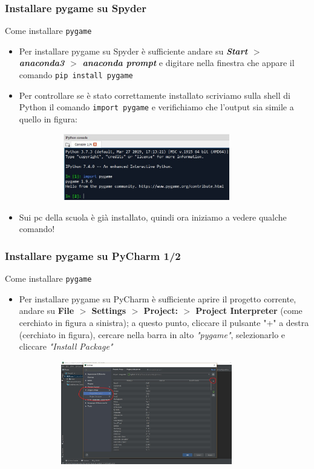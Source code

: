 \documentclass{beamer}
\begin{document}
\begin{frame}[fragile]
\frametitle{Installare pygame su Spyder}
	\begin{block}{Come installare \texttt{pygame}}
		\begin{itemize}
			\item Per installare pygame su Spyder è sufficiente andare su \textit{\textbf{Start $>$ anaconda3 $>$ anaconda prompt}} e digitare nella finestra che appare il comando \texttt{pip install pygame}
			\item Per controllare se è stato correttamente installato scriviamo sulla shell di Python il comando \texttt{import pygame} e verifichiamo che l'output sia simile a quello in figura:
			\begin{figure}[t]
				\includegraphics[height=2.9cm, width=9cm]{images/Import-pygame.jpg}
			\end{figure}
			\item Sui pc della scuola è già installato, quindi ora iniziamo a vedere qualche comando!
		\end{itemize}
	\end{block}
\end{frame}

\begin{frame}[fragile]
\frametitle{Installare pygame su PyCharm 1/2}
\begin{block}{Come installare \texttt{pygame}}
	\begin{itemize}
		\item Per installare pygame su PyCharm è sufficiente aprire il progetto corrente, andare su \textbf{File $>$ Settings $>$ Project: $>$ Project Interpreter} (come cerchiato in figura a sinistra); a questo punto, cliccare il pulsante "+" a destra (cerchiato in figura), cercare nella barra in alto \textit{"pygame"}, selezionarlo e cliccare \textit{"Install Package"}
		\begin{figure}[t]
			\includegraphics[height=4.5cm, width=9cm]{images/PyCharm.jpg}
		\end{figure}
	\end{itemize}
\end{block}
\end{frame}
\end{document}
